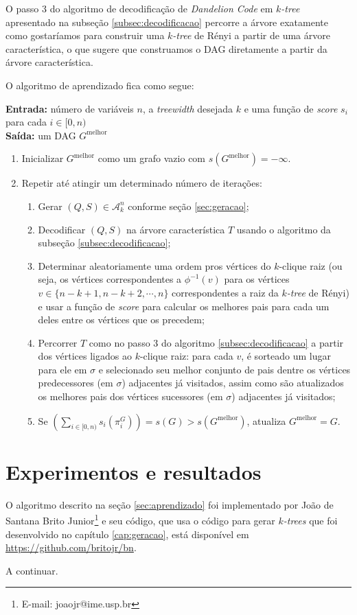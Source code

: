 O passo 3 do algoritmo de decodificação de \emph{Dandelion Code} em \emph{$k$-tree} apresentado na subseção \ref{subsec:decodificacao} percorre a árvore exatamente como gostaríamos para construir uma \emph{$k$-tree} de Rényi a partir de uma árvore característica, o que sugere que construamos o DAG diretamente a partir da árvore característica.

O algoritmo de aprendizado fica como segue:

\begin{algorithm}
  \textbf{Entrada:} número de variáveis $n$, a \emph{treewidth} desejada $k$ e uma função de \emph{score} $s_i$ para cada $i \in [0, n)$\\
  \textbf{Saída:} um DAG $G^{\text{melhor}}$

  \begin{enumerate}
    \item Inicializar $G^{\text{melhor}}$ como um grafo vazio com $s(G^{\text{melhor}}) = -\infty$.
    \item Repetir até atingir um determinado número de iterações:
      \begin{enumerate}
        \item Gerar $(Q, S) \in \mathcal{A}^n_k$ conforme seção \ref{sec:geracao};
        \item Decodificar $(Q, S)$ na árvore característica $T$ usando o algoritmo da subseção \ref{subsec:decodificacao};
        \item Determinar aleatoriamente uma ordem pros vértices do $k$-clique raiz (ou seja, os vértices correspondentes a $\phi^{-1}(v)$ para os vértices $v \in \{n-k+1, n-k+2, \cdots, n\}$ correspondentes a raiz da \emph{$k$-tree} de Rényi) e usar a função de \emph{score} para calcular os melhores pais para cada um deles entre os vértices que os precedem;
        \item Percorrer $T$ como no passo 3 do algoritmo \ref{subsec:decodificacao} a partir dos vértices ligados ao $k$-clique raiz: para cada $v$, é sorteado um lugar para ele em $\sigma$ e selecionado seu melhor conjunto de pais dentre os vértices predecessores (em $\sigma$) adjacentes já visitados, assim como são atualizados os melhores pais dos vértices sucessores (em $\sigma$) adjacentes já visitados;
        \item Se $\left(\sum_{i \in [0,n)} s_i(\pi^G_{i})\right) = s(G) > s(G^{\text{melhor}})$, atualiza $G^{\text{melhor}} = G$.
      \end{enumerate}
  \end{enumerate}
\end{algorithm}

\section{Experimentos e resultados}

O algoritmo descrito na seção \ref{sec:aprendizado} foi implementado por João de Santana Brito Junior\footnote{E-mail: joaojr@ime.usp.br} e seu código, que usa o código para gerar \emph{$k$-trees} que foi desenvolvido no capítulo \ref{cap:geracao}, está disponível em \url{https://github.com/britojr/bn}.

A continuar. %
